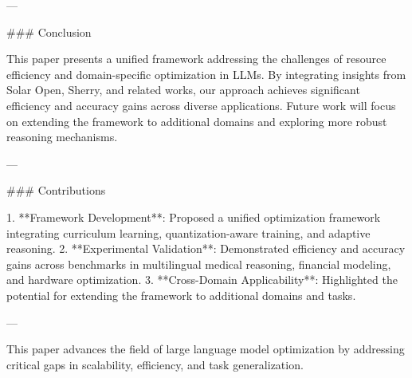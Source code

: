 ---

### Conclusion

This paper presents a unified framework addressing the challenges of resource efficiency and domain-specific optimization in LLMs. By integrating insights from Solar Open, Sherry, and related works, our approach achieves significant efficiency and accuracy gains across diverse applications. Future work will focus on extending the framework to additional domains and exploring more robust reasoning mechanisms.

---

### Contributions

1. **Framework Development**: Proposed a unified optimization framework integrating curriculum learning, quantization-aware training, and adaptive reasoning.
2. **Experimental Validation**: Demonstrated efficiency and accuracy gains across benchmarks in multilingual medical reasoning, financial modeling, and hardware optimization.
3. **Cross-Domain Applicability**: Highlighted the potential for extending the framework to additional domains and tasks.

--- 

This paper advances the field of large language model optimization by addressing critical gaps in scalability, efficiency, and task generalization.